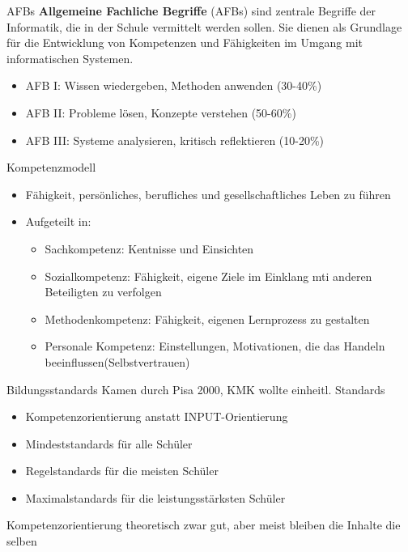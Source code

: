 \documentclass{article}
\begin{document}
\begin{block}{AFBs}
    \textbf{Allgemeine Fachliche Begriffe} (AFBs) sind zentrale Begriffe der Informatik, die in der Schule vermittelt werden sollen. Sie dienen als Grundlage für die Entwicklung von Kompetenzen und Fähigkeiten im Umgang mit informatischen Systemen.
    \begin{itemize}
        \item AFB I: Wissen wiedergeben, Methoden anwenden (30-40\%)
        \item AFB II: Probleme lösen, Konzepte verstehen (50-60\%)
        \item AFB III: Systeme analysieren, kritisch reflektieren (10-20\%)
    \end{itemize}
\end{block}

\begin{block}{Kompetenzmodell}
    \begin{itemize}
        \item Fähigkeit, persönliches, berufliches und gesellschaftliches Leben zu führen
        \item Aufgeteilt in:
        \begin{itemize}
            \item Sachkompetenz: Kentnisse und Einsichten
            \item Sozialkompetenz: Fähigkeit, eigene Ziele im Einklang mti anderen Beteiligten zu verfolgen
            \item Methodenkompetenz: Fähigkeit, eigenen Lernprozess zu gestalten
            \item Personale Kompetenz: Einstellungen, Motivationen, die das Handeln beeinflussen(Selbstvertrauen)
        \end{itemize}
    \end{itemize}
\end{block}

\begin{block}{Bildungsstandards}
    Kamen durch Pisa 2000, KMK wollte einheitl. Standards
    \begin{itemize}
        \item Kompetenzorientierung anstatt INPUT-Orientierung
        \item Mindeststandards für alle Schüler
        \item Regelstandards für die meisten Schüler
        \item Maximalstandards für die leistungsstärksten Schüler
    \end{itemize}
    Kompetenzorientierung theoretisch zwar gut, aber meist bleiben die Inhalte die selben
\end{block}
\end{document}
